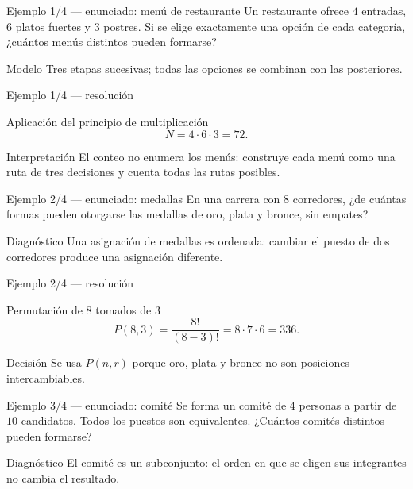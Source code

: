 \documentclass[10pt,aspectratio=169]{beamer}
\begin{document}
\begin{frame}{Ejemplo 1/4 --- enunciado: menú de restaurante}
  \small
  Un restaurante ofrece $4$ entradas, $6$ platos fuertes y $3$ postres.
  Si se elige exactamente una opción de cada categoría, ¿cuántos menús
  distintos pueden formarse?
  \vfill
  \begin{alertblock}{Modelo}
    Tres etapas sucesivas; todas las opciones se combinan con las posteriores.
  \end{alertblock}
\end{frame}

\begin{frame}{Ejemplo 1/4 --- resolución}
  \small
  \begin{block}{Aplicación del principio de multiplicación}
    \[
      N=4\cdot6\cdot3=72.
    \]
  \end{block}
  \begin{exampleblock}{Interpretación}
    El conteo no enumera los menús: construye cada menú como una ruta de tres
    decisiones y cuenta todas las rutas posibles.
  \end{exampleblock}
\end{frame}

\begin{frame}{Ejemplo 2/4 --- enunciado: medallas}
  \small
  En una carrera con $8$ corredores, ¿de cuántas formas pueden otorgarse las
  medallas de oro, plata y bronce, sin empates?
  \vfill
  \begin{alertblock}{Diagnóstico}
    Una asignación de medallas es ordenada: cambiar el puesto de dos
    corredores produce una asignación diferente.
  \end{alertblock}
\end{frame}

\begin{frame}{Ejemplo 2/4 --- resolución}
  \small
  \begin{block}{Permutación de $8$ tomados de $3$}
    \[
      P(8,3)=\frac{8!}{(8-3)!}=8\cdot7\cdot6=336.
    \]
  \end{block}
  \begin{exampleblock}{Decisión}
    Se usa $P(n,r)$ porque oro, plata y bronce no son posiciones
    intercambiables.
  \end{exampleblock}
\end{frame}

\begin{frame}{Ejemplo 3/4 --- enunciado: comité}
  \small
  Se forma un comité de $4$ personas a partir de $10$ candidatos. Todos los
  puestos son equivalentes. ¿Cuántos comités distintos pueden formarse?
  \vfill
  \begin{alertblock}{Diagnóstico}
    El comité es un subconjunto: el orden en que se eligen sus integrantes no
    cambia el resultado.
  \end{alertblock}
\end{frame}
\end{document}
